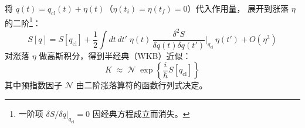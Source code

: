 将 $q(t) = q_{\text{cl}}(t) + \eta(t)$（$\eta(t_i) = \eta(t_f) = 0$）代入作用量，
展开到涨落 $\eta$ 的二阶\footnote{
一阶项 $\delta S/\delta q|_{q_{\text{cl}}} = 0$ 因经典方程成立而消失。}：
\begin{equation}
  S[q] = S[q_{\text{cl}}]
  + \frac{1}{2}\int\!dt\,dt'\;\eta(t)\,
    \frac{\delta^2 S}{\delta q(t)\delta q(t')}\bigg|_{q_{\text{cl}}}\,\eta(t')
  + O(\eta^3)
\end{equation}
对涨落 $\eta$ 做高斯积分，得到半经典（WKB）近似：
\begin{equation}
  K \;\approx\; \mathcal{N}\;\exp\!\left\{\frac{i}{\hbar}S[q_{\text{cl}}]\right\}
\end{equation}
其中预指数因子 $\mathcal{N}$ 由二阶涨落算符的函数行列式决定。

